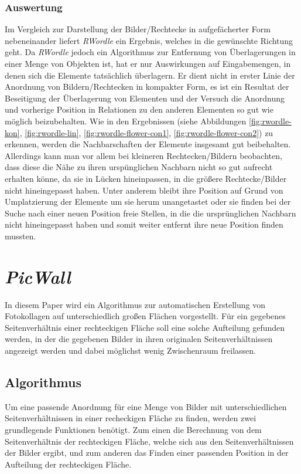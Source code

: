 \documentclass[12pt, ngerman, utf8]{article}
\begin{document}
\subsubsection{Auswertung}
Im Vergleich zur Darstellung der Bilder/Rechtecke in aufgefächerter Form nebeneinander liefert \emph{RWordle} ein Ergebnis, welches in die gewünschte Richtung geht. Da \emph{RWordle} jedoch ein Algorithmus zur Entfernung von Überlagerungen in einer Menge von Objekten ist, hat er nur Auswirkungen auf Eingabemengen, in denen sich die Elemente tatsächlich überlagern. Er dient nicht in erster Linie der Anordnung von Bildern/Rechtecken in kompakter Form, es ist ein Resultat der Beseitigung der Überlagerung von Elementen und der Versuch die Anordnung und vorherige Position in Relationen zu den anderen Elementen so gut wie möglich beizubehalten. Wie in den Ergebnissen (siehe Abbildungen \ref{fig:rwordle-kon}, \ref{fig:rwordle-lin}, \ref{fig:rwordle-flower-con1}, \ref{fig:rwordle-flower-con2}) zu erkennen, werden die Nachbarschaften der Elemente insgesamt gut beibehalten.\\
Allerdings kann man vor allem bei kleineren Rechtecken/Bildern beobachten, dass diese die Nähe zu ihren urspünglichen Nachbarn nicht so gut aufrecht erhalten könne, da sie in Lücken hineinpassen, in die größere Rechtecke/Bilder nicht hineingepasst haben. Unter anderem bleibt ihre Position auf Grund von Umplatzierung der Elemente um sie herum unangetastet oder sie finden bei der Suche nach einer neuen Position freie Stellen, in die die ursprünglichen Nachbarn nicht hineingepasst haben und somit weiter entfernt ihre neue Position finden mussten.

\section{\textit{PicWall}}
In diesem Paper wird ein Algorithmus zur automatischen Erstellung von Fotokollagen auf unterschiedlich großen Flächen vorgestellt. Für ein gegebenes Seitenverhältnis einer rechteckigen Fläche soll eine solche Aufteilung gefunden werden, in der die gegebenen Bilder in ihren originalen Seitenverhältnissen angezeigt werden und dabei möglichst wenig Zwischenraum freilassen.

\subsection{Algorithmus}
Um eine passende Anordnung für eine Menge von Bilder mit unterschiedlichen Seitenverhältnissen in einer recheckigen Fläche zu finden, werden zwei grundlegende Funktionen benötigt. Zum einen die Berechnung von dem Seitenverhältnis der rechteckigen Fläche, welche sich aus den Seitenverhältnissen der Bilder ergibt, und zum anderen das Finden einer passenden Position in der Aufteilung der rechteckigen Fläche. 
\end{document}
